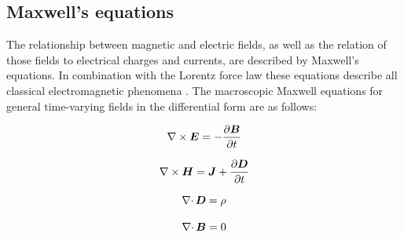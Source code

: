 \subsection{Maxwell's equations}
\label{subsec:Maxwell}
The relationship between magnetic and electric fields, as well as the relation of those fields to electrical charges and currents, are described by  Maxwell’s equations. In combination with the Lorentz force law these equations describe all classical electromagnetic phenomena \cite{meschede2015gerthsen}. The macroscopic Maxwell equations for general time-varying fields in the differential form are as follows: 

\begin{equation}
\label{eq:Faraday}
\centering
\nabla\times\boldsymbol{E} = -\frac{\partial\boldsymbol{B}}{\partial t}
\end{equation}

\begin{equation}
\label{eq:Ampere}
\centering
\nabla\times\boldsymbol{H} = \boldsymbol{J} + \frac{\partial\boldsymbol{D}}{\partial t}
\end{equation}

\begin{equation}
\label{eq:Gauss_elec}
\centering
\nabla\cdotp\boldsymbol{D} = \rho 
\end{equation}

\begin{equation}
\label{eq:Gauss_mag}
\centering
\nabla\cdotp\boldsymbol{B} = 0
\end{equation}

